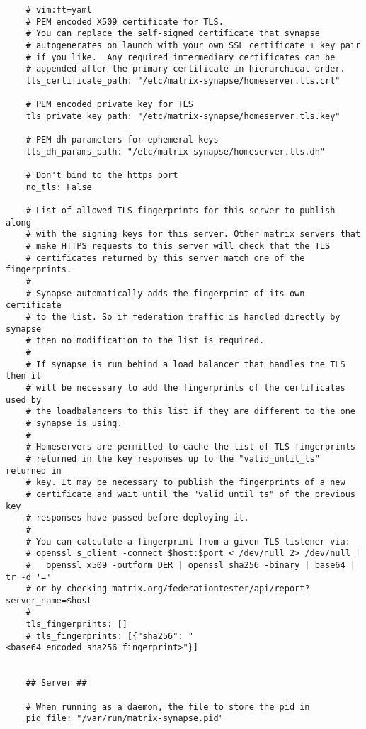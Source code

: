 \begin{lstlisting}
    # vim:ft=yaml
    # PEM encoded X509 certificate for TLS.
    # You can replace the self-signed certificate that synapse
    # autogenerates on launch with your own SSL certificate + key pair
    # if you like.  Any required intermediary certificates can be
    # appended after the primary certificate in hierarchical order.
    tls_certificate_path: "/etc/matrix-synapse/homeserver.tls.crt"
    
    # PEM encoded private key for TLS
    tls_private_key_path: "/etc/matrix-synapse/homeserver.tls.key"
    
    # PEM dh parameters for ephemeral keys
    tls_dh_params_path: "/etc/matrix-synapse/homeserver.tls.dh"
    
    # Don't bind to the https port
    no_tls: False
    
    # List of allowed TLS fingerprints for this server to publish along
    # with the signing keys for this server. Other matrix servers that
    # make HTTPS requests to this server will check that the TLS
    # certificates returned by this server match one of the fingerprints.
    #
    # Synapse automatically adds the fingerprint of its own certificate
    # to the list. So if federation traffic is handled directly by synapse
    # then no modification to the list is required.
    #
    # If synapse is run behind a load balancer that handles the TLS then it
    # will be necessary to add the fingerprints of the certificates used by
    # the loadbalancers to this list if they are different to the one
    # synapse is using.
    #
    # Homeservers are permitted to cache the list of TLS fingerprints
    # returned in the key responses up to the "valid_until_ts" returned in
    # key. It may be necessary to publish the fingerprints of a new
    # certificate and wait until the "valid_until_ts" of the previous key
    # responses have passed before deploying it.
    #
    # You can calculate a fingerprint from a given TLS listener via:
    # openssl s_client -connect $host:$port < /dev/null 2> /dev/null |
    #   openssl x509 -outform DER | openssl sha256 -binary | base64 | tr -d '='
    # or by checking matrix.org/federationtester/api/report?server_name=$host
    #
    tls_fingerprints: []
    # tls_fingerprints: [{"sha256": "<base64_encoded_sha256_fingerprint>"}]
    
    
    ## Server ##
    
    # When running as a daemon, the file to store the pid in
    pid_file: "/var/run/matrix-synapse.pid"
    

\end{lstlisting}
